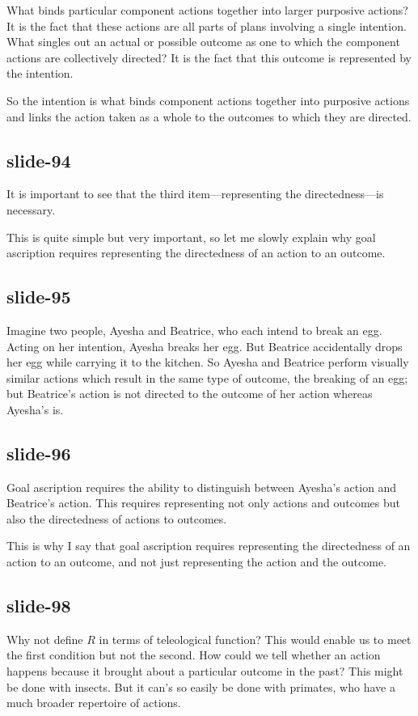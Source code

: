 \documentclass[12pt,\papersize]{extarticle}
\begin{document}
What binds particular component actions together into larger purposive actions?
It is the fact that these actions are all parts of plans involving a single intention.
What singles out an actual or possible outcome as one to which the component
actions are collectively directed?  It is the fact that this outcome is
represented by the intention.

So the intention is what binds component actions together into purposive actions and
links the action taken as a whole to the outcomes to which they are directed.

\subsection{slide-94}
It is important to see that the third item---representing the directedness---is necessary.

This is quite simple but very important, so let me slowly explain why goal ascription requires representing the directedness of an action to an outcome.

\subsection{slide-95}
Imagine two people, Ayesha and Beatrice, who each intend to break an egg.
Acting on her intention, Ayesha breaks her egg.
But Beatrice accidentally drops her egg while carrying it to the kitchen.
So Ayesha and Beatrice perform visually similar actions which result in the same type of outcome,
the breaking of an egg; but Beatrice's action is not directed to the outcome of her action whereas
Ayesha's is.

\subsection{slide-96}
Goal ascription requires the ability to distinguish between Ayesha's action and Beatrice's action.
This requires representing not only actions and outcomes but also the directedness of actions to outcomes.

This is why I say that goal ascription requires representing the directedness of an action to an outcome, and not just representing the action and the outcome.

\subsection{slide-98}
Why not define $R$ in terms of teleological function?
This would enable us to meet the first condition but not the second.
How could we tell whether an action happens because it brought about a particular outcome in the past?
This might be done with insects.
But it can's so easily be done with primates, who have a much broader repertoire of actions.
\end{document}
